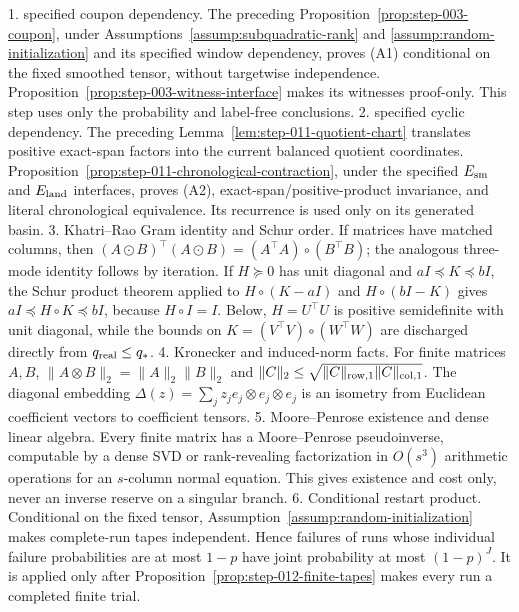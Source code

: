 1. specified coupon dependency.  The preceding
   Proposition~\ref{prop:step-003-coupon}, under
   Assumptions~\ref{assump:subquadratic-rank} and
   \ref{assump:random-initialization} and its specified window dependency,
   proves (A1) conditional on the fixed smoothed tensor, without targetwise
   independence.  Proposition~\ref{prop:step-003-witness-interface} makes its
   witnesses proof-only.  This step uses only the probability and label-free
   conclusions.
2. specified cyclic dependency.  The preceding
   Lemma~\ref{lem:step-011-quotient-chart} translates positive exact-span
   factors into the current balanced quotient coordinates.
   Proposition~\ref{prop:step-011-chronological-contraction}, under the
   specified \(E_{\rm sm}\) and \(E_{\rm land}\) interfaces, proves (A2),
   exact-span/positive-product invariance, and literal chronological
   equivalence.  Its recurrence is used only on its generated basin.
3. Khatri--Rao Gram identity and Schur order.  If matrices have matched
   columns, then
   \((A\odot B)^\top(A\odot B)=(A^\top A)\circ(B^\top B)\); the analogous
   three-mode identity follows by iteration.  If \(H\succeq0\) has unit
   diagonal and \(aI\preceq K\preceq bI\), the Schur product theorem applied
   to \(H\circ(K-aI)\) and \(H\circ(bI-K)\) gives
   \(aI\preceq H\circ K\preceq bI\), because \(H\circ I=I\).  Below,
   \(H=U^\top U\) is positive semidefinite with unit diagonal, while the
   bounds on \(K=(V^\top V)\circ(W^\top W)\) are discharged directly from
   \(q_{\rm real}\le q_*\).
4. Kronecker and induced-norm facts.  For finite matrices \(A,B\),
   \(\|A\otimes B\|_2=\|A\|_2\|B\|_2\) and
   \(\|C\|_2\le\sqrt{\|C\|_{\rm row,1}\|C\|_{\rm col,1}}\).  The
   diagonal embedding
   \(\Delta(z)=\sum_jz_je_j\otimes e_j\otimes e_j\) is an isometry from
   Euclidean coefficient vectors to coefficient tensors.
5. Moore--Penrose existence and dense linear algebra.  Every finite
   matrix has a Moore--Penrose pseudoinverse, computable by a dense SVD or
   rank-revealing factorization in \(O(s^3)\) arithmetic operations for an
   \(s\)-column normal equation.  This gives existence and cost only, never
   an inverse reserve on a singular branch.
6. Conditional restart product.  Conditional on the fixed tensor,
   Assumption~\ref{assump:random-initialization} makes complete-run tapes
   independent.  Hence failures of runs whose individual failure
   probabilities are at most \(1-p\) have joint probability at most
   \((1-p)^J\).  It is applied only after
   Proposition~\ref{prop:step-012-finite-tapes} makes every run a completed
   finite trial.


